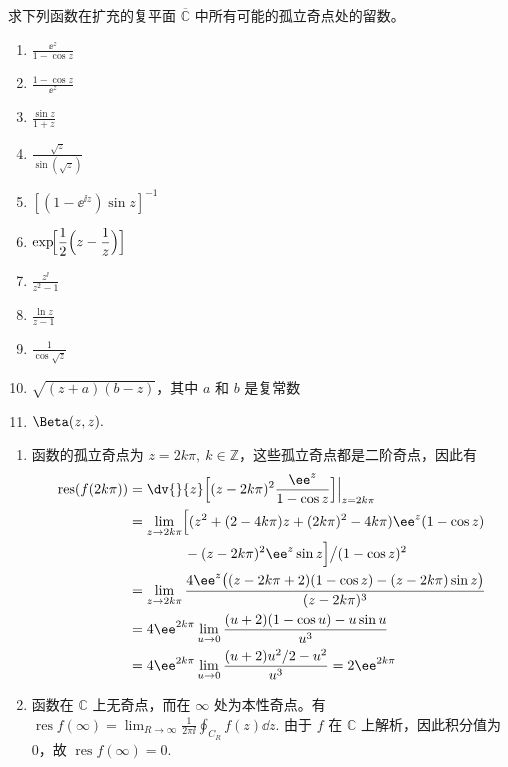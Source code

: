 \begin{question}
求下列函数在扩充的复平面 \(\overline{\mathbb{C}}\) 中所有可能的孤立奇点处的留数。

\begin{enumerate}
  \item \(\displaystyle\frac{\ee^z}{1-\cos z}\)
  \item \(\displaystyle\frac{1-\cos z}{\ee^z}\)
  \item \(\displaystyle\frac{\sin z}{1+z}\)
  \item \(\displaystyle\frac{\sqrt{z}}{\sin(\sqrt{z})}\)
  \item \([(1-\ee^{\ii z})\sin z]^{-1}\)

  \item \(\displaystyle\exp\!\Bigl[\frac12\Bigl(z-\frac1z\Bigr)\Bigr]\)
  \item \(\displaystyle\frac{z^{\ii}}{z^2-1}\)
  \item \(\displaystyle\frac{\ln z}{z-1}\)
  \item \(\displaystyle\frac{1}{\cos\sqrt{z}}\)

  \item \(\displaystyle\sqrt{(z+a)(b-z)}\)，其中 \(a\) 和 \(b\) 是复常数
  \item \(\displaystyle\Beta(z,z).\)
\end{enumerate}
\begin{solution}
\begin{enumerate}
  \item 函数的孤立奇点为 \(z=2k\pi,\ k\in\mathbb{Z}\)，这些孤立奇点都是二阶奇点，因此有
\[
\begin{aligned}
\operatorname{res}(f(2k\pi))&=\Bigl.\dv{}{z}\Bigl[(z-2k\pi)^2\frac{\ee^z}{1-\cos z}\Bigr]\Bigr|_{z=2k\pi}\\

&=\lim_{z\to 2k\pi}\Bigl[(z^2+(2-4k\pi)z+(2k\pi)^2-4k\pi)\ee^z(1-\cos z)\\
&\qquad\qquad-(z-2k\pi)^2\ee^z\sin z\Bigr]\big/(1-\cos z)^2\\
&=\lim_{z\to2k\pi}\frac{4\ee^z\bigl((z-2k\pi+2)(1-\cos z)-(z-2k\pi)\sin z\bigr)}{(z-2k\pi)^3}\\
&=4\ee^{2k\pi}\lim_{u\to0}\frac{(u+2)(1-\cos u)-u\sin u}{u^3}\\
&=4\ee^{2k\pi}\lim_{u\to0}\frac{(u+2)u^2/2-u^2}{u^3}
  =2\ee^{2k\pi}
\end{aligned}
\]

  \item 函数在 \(\mathbb{C}\) 上无奇点，而在 \(\infty\) 处为本性奇点。有 \(\operatorname{res}f(\infty)=\displaystyle\lim_{R\to\infty}\frac1{2\pi\ii}\oint_{C_R}f(z)\dd{z}\). 由于 \(f\) 在 \(\mathbb{C}\) 上解析，因此积分值为 0，故 \(\operatorname{res}f(\infty)=0\).


\end{enumerate}
\end{solution}
\end{question}
